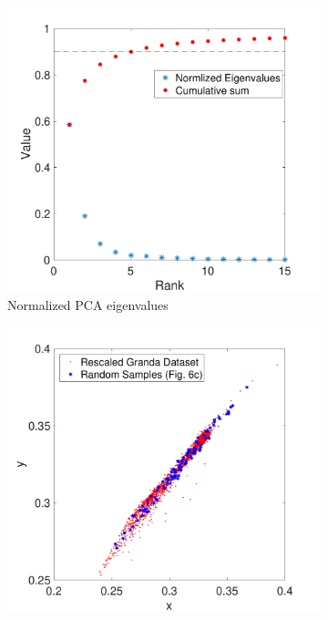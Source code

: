 \documentclass{jov}
\begin{document}
\begin{figure}
	\begin{subfigure}[b]{0.3 \textwidth}
    \centering
        \includegraphics[width=\textwidth]{../Figures/Figure6/Figure6_d.pdf}
        \caption{Normalized PCA eigenvalues}
        \label{fig:granadaEV}
    \end{subfigure}
	\begin{subfigure}[b]{0.3 \textwidth}
    \centering
        \includegraphics[width=\textwidth]{../Figures/Figure6/Figure6_e.pdf}

\end{subfigure}
\end{figure}
\end{document}
